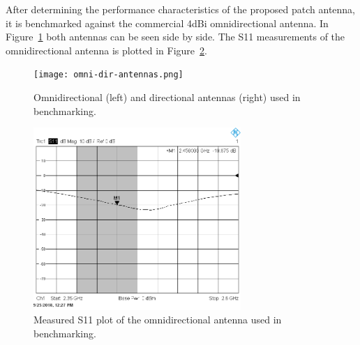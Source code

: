 \documentclass[12pt, oneandhalf, chaparabic, sees, ms]{metu}
\begin{document}
\newpage


After determining the performance characteristics of the proposed patch antenna, it is benchmarked against the commercial 4dBi omnidirectional antenna.
In Figure~\ref{fig:omni-dir} both antennas can be seen side by side. 
The S11 measurements of the omnidirectional antenna is plotted in Figure~\ref{fig:omni-245-s11}.
%
%
% 
\begin{figure}[!htbp]
 \begin{center}
  \texttt{[image: omni-dir-antennas.png]}
 \end{center}
 \caption{Omnidirectional (left) and directional antennas (right) used in benchmarking.}
  \label{fig:omni-dir}
\end{figure}





\begin{figure}[!htbp]
 \begin{center}
  \includegraphics[width=0.7\textwidth]{omni-245-s11-bw2.png}
 \end{center}
 \caption{Measured S11 plot of the omnidirectional antenna used in benchmarking.}
  \label{fig:omni-245-s11}
\end{figure}
%
%
\end{document}
